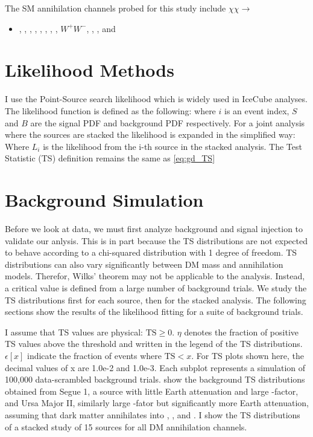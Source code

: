 The SM annihilation channels probed for this study include $\chi\chi \rightarrow$
\begin{itemize}
    \item[] , , , , , \parpar{\mu}, \parpar{\tau}, , $W^+W^-$, , \parpar{\nu_\mu}, and \parpar{\nu_\tau}
\end{itemize}

\section{Likelihood Methods}\label{sec:icDM_LLH}

I use the Point-Source search likelihood which is widely used in IceCube analyses.
The likelihood function is defined as the following:
\icPtSrcLLH
where  $ i $ is an event index, $S$ and $B$ are the signal PDF and background PDF respectively. For a joint analysis where the sources are stacked the likelihood is expanded in the simplified way:
\icStackLLH
Where $ L_i $ is the likelihood from the i-th source in the stacked analysis.
The Test Statistic (TS) definition remains the same as \cref{eq:gd_TS}

\section{Background Simulation}\label{sec:icDM_bkgd_sim}

Before we look at data, we must first analyze background and signal injection to validate our anlysis.
This is in part because the TS distributions are not expected to behave according to a chi-squared distribution with 1 degree of freedom.
TS distributions can also vary significantly between DM mass and annihilation models.
Therefor, Wilks' theorem may not be applicable to the analysis.
Instead, a critical value is defined from a large number of background trials.
We study the TS distributions first for each source, then for the stacked analysis.
The following sections show the results of the likelihood fitting for a suite of background trials.

I assume that TS values are physical: $ \mathrm{TS} \ge 0 $.
$\eta$ denotes the fraction of positive TS values above the threshold and written in the legend of the TS distributions.
$ \epsilon[x] $ indicate the fraction of events where $ \mathrm{TS} < x $. For TS plots shown here, the decimal values of x are 1.0e-2 and 1.0e-3.
Each subplot represents a simulation of 100,000 data-scrambled background trials.
 show the background TS distributions obtained from Segue 1, a source with little Earth attenuation and large \J-factor, and Ursa Major II, similarly large \J-fator but significantly more Earth attenuation, assuming that dark matter annihilates into , \parpar{\tau}, and \parpar{\nu_\mu}.
I show the TS distributions of a stacked study of 15 sources for all DM annihilation channels.

